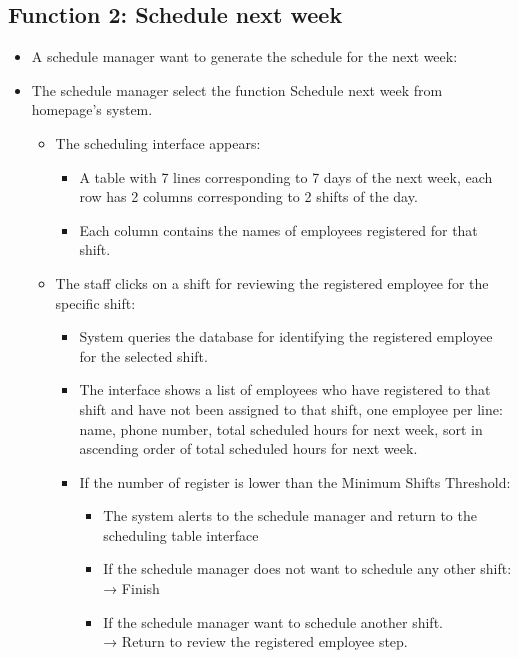 \subsection{Function 2: Schedule next week}
\begin{itemize}
    \item A schedule manager want to generate the schedule for the next week:
    \item The schedule manager select the function Schedule next week from homepage’s system.
        \begin{itemize}
        \item The scheduling interface appears:
            \begin{itemize}
                \item A table with 7 lines corresponding to 7 days of the next week, each row has 2 columns corresponding to 2 shifts of the day.
                \item Each column contains the names of employees registered for that shift.
            \end{itemize}
        \item The staff clicks on a shift for reviewing the registered employee for the specific shift:
            \begin{itemize}
                \item System queries the database for identifying the registered employee for the selected shift.
                \item The interface shows a list of employees who have registered to that shift and have not been assigned to that shift, one employee per line: name, phone number, total scheduled hours for next week, sort in ascending order of total scheduled hours for next week.
                \item If the number of register is lower than the Minimum Shifts Threshold:
                    \begin{itemize}
                        \item The system alerts to the schedule manager and return to the scheduling table interface
                        \item If the schedule manager does not want to schedule any other shift:\\
                        → Finish
                        \item If the schedule manager want to schedule another shift.\\
                        → Return to review the registered employee step.

\end{itemize}
\end{itemize}
\end{itemize}
\end{itemize}
